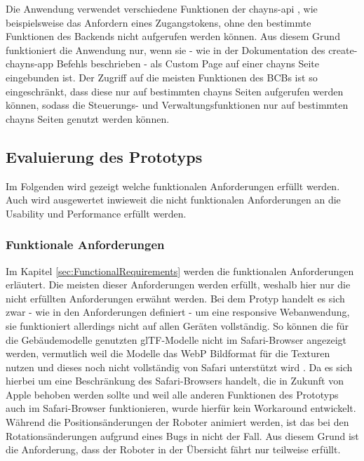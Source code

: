 Die Anwendung verwendet verschiedene Funktionen der chayns-api \cite{ChaynsApi}, wie beispielsweise das Anfordern eines Zugangstokens, ohne den bestimmte Funktionen des Backends nicht aufgerufen werden können.
Aus diesem Grund funktioniert die Anwendung nur, wenn sie - wie in der Dokumentation des create-chayns-app Befehls beschrieben \cite{CreateChaynsApp} - als Custom Page auf einer chayns Seite eingebunden ist. Der Zugriff auf die meisten Funktionen des \ac{BCB}s ist so eingeschränkt, dass diese nur auf bestimmten chayns Seiten aufgerufen werden können, sodass die Steuerungs- und Verwaltungsfunktionen nur auf bestimmten chayns Seiten genutzt werden können.

\subsection{Evaluierung des Prototyps}
Im Folgenden wird gezeigt welche funktionalen Anforderungen erfüllt werden. Auch wird ausgewertet inwieweit die nicht funktionalen Anforderungen an die Usability und Performance erfüllt werden.

\subsubsection{Funktionale Anforderungen}
Im Kapitel \ref{sec:FunctionalRequirements} werden die funktionalen Anforderungen erläutert. Die meisten dieser Anforderungen werden erfüllt, weshalb hier nur die nicht erfüllten Anforderungen erwähnt werden. Bei dem Protyp handelt es sich zwar - wie in den Anforderungen definiert - um eine responsive Webanwendung, sie funktioniert allerdings nicht auf allen Geräten vollständig. So können die für die Gebäudemodelle genutzten \ac{glTF}-Modelle nicht im Safari-Browser angezeigt werden, vermutlich weil die Modelle das \ac{WebP} Bildformat für die Texturen nutzen und dieses noch nicht vollständig von Safari unterstützt wird \cite{CanIUseWebP}. Da es sich hierbei um eine Beschränkung des Safari-Browsers handelt, die in Zukunft von Apple behoben werden sollte und weil alle anderen Funktionen des Prototyps auch im Safari-Browser funktionieren, wurde hierfür kein Workaround entwickelt. Während die Positionsänderungen der Roboter animiert werden, ist das bei den Rotationsänderungen aufgrund eines Bugs in \deckgl{} nicht der Fall. Aus diesem Grund ist die Anforderung, dass der Roboter in der Übersicht fährt nur teilweise erfüllt.

